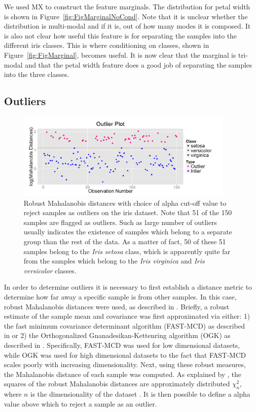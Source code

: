 \documentclass[12pt]{article}
\begin{document}
We used MX to construct the feature marginals. The distribution for petal width is shown in Figure~\ref{fig:FigMarginalNoCond}. Note that it is unclear whether the distribution is multi-modal and if it is, out of how many modes it is composed. It is also not clear how useful this feature is for separating the samples into the different iris classes. This is where conditioning on classes, shown in Figure~\ref{fig:FigMarginal}, becomes useful. It is now clear that the marginal is tri-modal and that the petal width feature does a good job of separating the samples into the three classes.

\subsection{Outliers}
\label{subsec:SubSecOutliers}

\begin{figure}[t!]
	\centering
	\includegraphics[width=0.95\textwidth]{Figures/Iris/OutliersIris.png}
	\caption{Robust Mahalanobis distances with choice of alpha cut-off value to reject samples as outliers on the iris dataset. Note that 51 of the 150 samples are flagged as outliers. Such as large number of outliers usually indicates the existence of samples which belong to a separate group than the rest of the data. As a matter of fact, 50 of these 51 samples belong to the \textit{Iris setosa} class, which is apparently quite far from the samples which belong to the \textit{Iris virginica} and \textit{Iris versicolor} classes.}
	\label{fig:FigOutliers}
\end{figure}

In order to determine outliers it is necessary to first establish a distance metric to determine how far away a specific sample is from other samples. In this case, robust Mahalanobis distances were used, as described in \cite{hubert2008high}. Briefly, a robust estimate of the sample mean and covariance was first approximated via either: 1) the fast minimum covariance determinant algorithm (FAST-MCD) as described in \cite{rousseeuw1999fast} or 2) the Orthogonalized Gnanadesikan-Kettenring algorithm (OGK) as described in \cite{maronna2002robust}. Specifically, FAST-MCD was used for low dimensional datasets, while OGK was used for high dimensional datasets to the fact that FAST-MCD scales poorly with increasing dimensionality. Next, using these robust measures, the Mahalanobis distance of each sample was computed. As explained by \cite{hardin2012distribution}, the squares of the robust Mahalanobis distances are approximately distributed $\chi^2_n$, where $n$ is the dimensionality of the dataset . It is then possible to define a alpha value above which to reject a sample as an outlier. 
\end{document}
